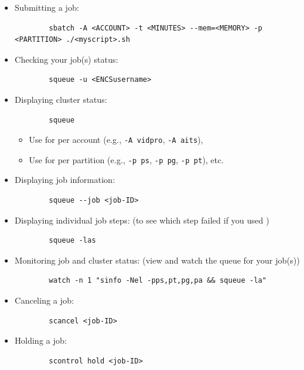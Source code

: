\begin{itemize}
	\item Submitting a job:
	\begin{verbatim}
		sbatch -A <ACCOUNT> -t <MINUTES> --mem=<MEMORY> -p <PARTITION> ./<myscript>.sh
	\end{verbatim}

	\item Checking your job(s) status:
	\begin{verbatim}
		squeue -u <ENCSusername>
	\end{verbatim}

	\item Displaying cluster status:
	\begin{verbatim}
		squeue
	\end{verbatim}
		\begin{itemize}
			\item Use  for per account (e.g., \texttt{-A vidpro}, \texttt{-A aits}), 
			\item Use  for per partition (e.g., \texttt{-p ps}, \texttt{-p pg}, \texttt{-p pt}), etc.
		\end{itemize}

	\item Displaying job information:
	\begin{verbatim}
		squeue --job <job-ID>
	\end{verbatim}

	\item Displaying individual job steps: (to see which step failed if you used )
	\begin{verbatim}
		squeue -las
	\end{verbatim}

	\item Monitoring job and cluster status: (view  and watch the queue for your job(s))
	\begin{verbatim}
		watch -n 1 "sinfo -Nel -pps,pt,pg,pa && squeue -la"
	\end{verbatim}

	\item Canceling a job:
	\begin{verbatim}
		scancel <job-ID>
	\end{verbatim}

	\item Holding a job:
	\begin{verbatim}
		scontrol hold <job-ID>
	\end{verbatim}


\end{itemize}
